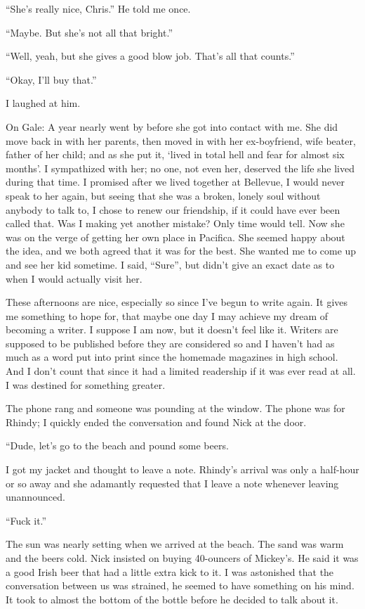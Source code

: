 ``She's really nice, Chris.'' He told me once.

``Maybe. But she's not all that bright.''

``Well, yeah, but she gives a good blow job. That's all that counts.''

``Okay, I'll buy that.''

I laughed at him.

On Gale: A year nearly went by before she got into contact with me. She
did move back in with her parents, then moved in with her ex-boyfriend,
wife beater, father of her child; and as she put it, `lived in total
hell and fear for almost six months'. I sympathized with her; no one,
not even her, deserved the life she lived during that time. I promised
after we lived together at Bellevue, I would never speak to her again,
but seeing that she was a broken, lonely soul without anybody to talk
to, I chose to renew our friendship, if it could have ever been called
that. Was I making yet another mistake? Only time would tell. Now she
was on the verge of getting her own place in Pacifica. She seemed happy
about the idea, and we both agreed that it was for the best. She wanted
me to come up and see her kid sometime. I said, ``Sure'', but didn't
give an exact date as to when I would actually visit her.

These afternoons are nice, especially so since I've begun to write
again. It gives me something to hope for, that maybe one day I may
achieve my dream of becoming a writer. I suppose I am now, but it
doesn't feel like it. Writers are supposed to be published before they
are considered so and I haven't had as much as a word put into print
since the homemade magazines in high school. And I don't count that
since it had a limited readership if it was ever read at all. I was
destined for something greater.

The phone rang and someone was pounding at the window. The phone was for
Rhindy; I quickly ended the conversation and found Nick at the door.

``Dude, let's go to the beach and pound some beers.

I got my jacket and thought to leave a note. Rhindy's arrival was only a
half-hour or so away and she adamantly requested that I leave a note
whenever leaving unannounced.

``Fuck it.''

The sun was nearly setting when we arrived at the beach. The sand was
warm and the beers cold. Nick insisted on buying 40-ouncers of Mickey's.
He said it was a good Irish beer that had a little extra kick to it. I
was astonished that the conversation between us was strained, he seemed
to have something on his mind. It took to almost the bottom of the
bottle before he decided to talk about it.

